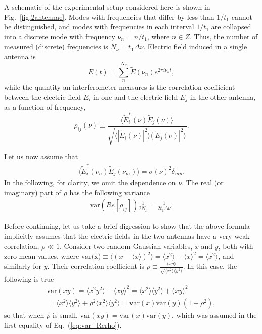 \documentclass[aps,prd,twocolumn,floatfix,showpacs,superscriptaddress,nofootinbib]{revtex4-1}
\newcommand{\beq}{\begin{equation}}
\newcommand{\eeq}{\end{equation}}
\newcommand{\bga}{\begin{gathered}}
\newcommand{\ega}{\end{gathered}}
\newcommand{\eq}[1]{{Eq.~(#1)}}
\begin{document}
A schematic of the experimental setup considered here is shown in Fig.~\ref{fig:2antennae}. Modes with frequencies that differ by less than $1/t_1$ cannot be distinguished, and modes with frequencies in each interval $1/t_1$ are collapsed into a discrete mode with frequency $\nu_n = n/t_1$, where $n\in Z$. Thus, the number of measured (discrete) frequencies is $N_\nu=t_1\Delta \nu$. Electric field induced in a single antenna is
\beq
E(t) = \sum_{n}^{N_\nu}\widetilde{E}(\nu_n)e^{2\pi i\nu_nt},
\eeq
while the quantity an interferometer measures is the correlation coefficient between the electric field $E_i$ in one and the electric field $E_j$ in the other antenna, as a function of frequency,
\beq
\rho_{ij}(\nu) \equiv \frac{\langle \widetilde{E}^*_i(\nu)\widetilde E_j(\nu)\rangle}{\sqrt{\langle |\widetilde{E}_i(\nu)|^2\rangle\langle|\widetilde E_j(\nu)|^2\rangle}}.
\label{eq:rho_ij}
\eeq

Let us now assume that 
\beq
\bga
\langle \widetilde{E}^*_i(\nu_n)\widetilde E_j(\nu_m)\rangle=\sigma(\nu)^2\delta_{mn}.
\ega
\label{eq:var_ReE}
\eeq
In the following, for clarity, we omit the dependence on $\nu$.  The real (or imaginary) part of $\rho$ has the following variance
\beq
\bga
\text{var}(Re[\rho_{ij}]) 
\frac{1}{2N_\nu} = \frac{1}{2t_1\Delta \nu}.
\ega
\label{eq:var_Rerho}
\eeq

Before continuing, let us take a brief digression to show that the above formula implicitly assumes that the electric fields in the two antennas have a very weak correlation, $\rho\ll 1$. Consider two random Gaussian variables, $x$ and $y$, both with zero mean values, where $\text{var(x)}\equiv\langle(x-\langle x\rangle)^2\rangle = \langle x^2\rangle - \langle x \rangle^2=\langle x^2\rangle$, and similarly for $y$. Their correlation coefficient is $\rho\equiv \frac{\langle xy\rangle}{\sqrt{\langle x^2\rangle \langle y^2\rangle}}$. In this case, the following is true
\beq
\bga
\text{var}(xy) = \langle x^2y^2\rangle -  \langle xy \rangle^2 = 
\langle x^2\rangle \langle y^2\rangle + \langle xy\rangle^2\\
=\langle x^2\rangle \langle y^2\rangle+\rho^2\langle x^2\rangle\langle y^2\rangle=\text{var}(x)\text{var}(y)(1+\rho^2),
\ega
\eeq
so that when $\rho$ is small, $\text{var}(xy)=\text{var}(x)\text{var}(y)$, which was assumed in the first equality of \eq{\ref{eq:var_Rerho}}.
\end{document}
